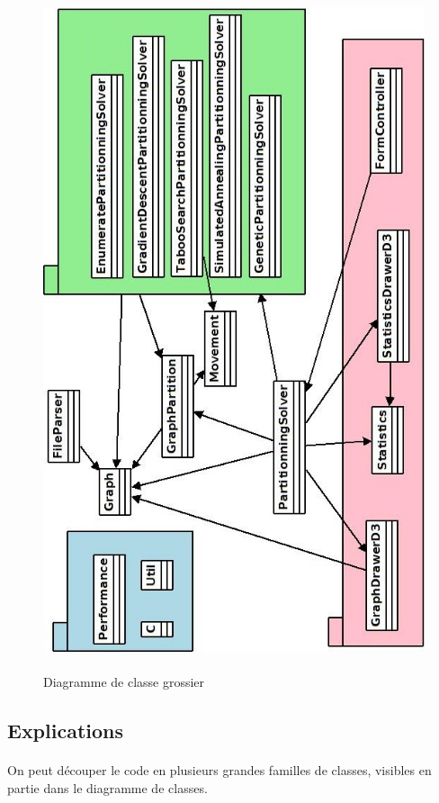 \documentclass[12pt]{article}
\begin{document}
\begin{figure}[H]
	\begin{center}
		\includegraphics[height=20cm]{pictures/classeGraph.jpeg}
	\end{center}
	\caption{Diagramme de classe grossier \label{fig:classdiagram}}
\end{figure}

\subsection{Explications}

\paragraph{}On peut découper le code en plusieurs grandes familles de classes, visibles en partie dans le diagramme de classes.
\end{document}
